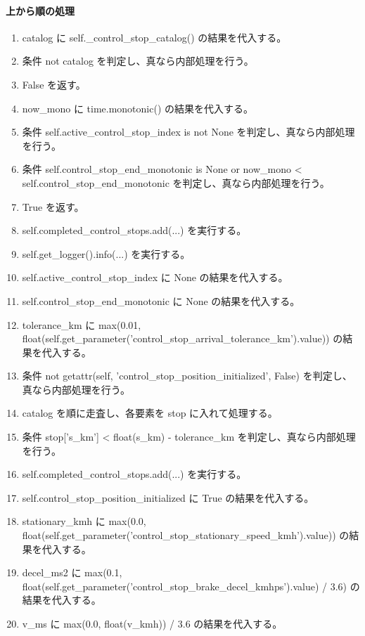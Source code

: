 \documentclass[a4paper,11pt]{article}
\begin{document}
            \paragraph{上から順の処理}
            \begin{enumerate}[leftmargin=1.8em]
            \item catalog に self.\_control\_stop\_catalog() の結果を代入する。
\item 条件 not catalog を判定し、真なら内部処理を行う。
\item   False を返す。
\item now\_mono に time.monotonic() の結果を代入する。
\item 条件 self.active\_control\_stop\_index is not None を判定し、真なら内部処理を行う。
\item   条件 self.control\_stop\_end\_monotonic is None or now\_mono < self.control\_stop\_end\_monotonic を判定し、真なら内部処理を行う。
\item     True を返す。
\item   self.completed\_control\_stops.add(...) を実行する。
\item   self.get\_logger().info(...) を実行する。
\item   self.active\_control\_stop\_index に None の結果を代入する。
\item   self.control\_stop\_end\_monotonic に None の結果を代入する。
\item tolerance\_km に max(0.01, float(self.get\_parameter('control\_stop\_arrival\_tolerance\_km').value)) の結果を代入する。
\item 条件 not getattr(self, 'control\_stop\_position\_initialized', False) を判定し、真なら内部処理を行う。
\item   catalog を順に走査し、各要素を stop に入れて処理する。
\item     条件 stop['s\_km'] < float(s\_km) - tolerance\_km を判定し、真なら内部処理を行う。
\item       self.completed\_control\_stops.add(...) を実行する。
\item   self.control\_stop\_position\_initialized に True の結果を代入する。
\item stationary\_kmh に max(0.0, float(self.get\_parameter('control\_stop\_stationary\_speed\_kmh').value)) の結果を代入する。
\item decel\_ms2 に max(0.1, float(self.get\_parameter('control\_stop\_brake\_decel\_kmhps').value) / 3.6) の結果を代入する。
\item v\_ms に max(0.0, float(v\_kmh)) / 3.6 の結果を代入する。

\end{enumerate}
\end{document}
